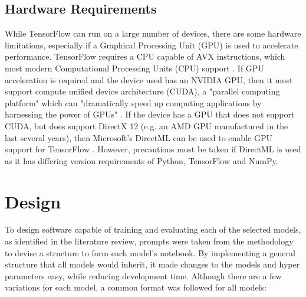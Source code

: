 \subsection{Hardware Requirements}
While TensorFlow can run on a large number of devices, there are some hardware limitations, especially if a Graphical Processing Unit (GPU) is used to accelerate performance. TensorFlow requires a CPU capable of AVX instructions, which most modern Computational Processing Units (CPU) support \citep{InstallT17:online}. If GPU acceleration is required and the device used has an NVIDIA GPU, then it must support compute unified device architecture (CUDA), a "parallel computing platform" which can "dramatically speed up computing applications by harnessing the power of GPUs" \citep{CUDAZone2:online}. If the device has a GPU that does not support CUDA, but does support DirectX 12 (e.g. an AMD GPU manufactured in the last several years), then Microsoft's DirectML can be used to enable GPU support for TensorFlow \citep{Introduc93:online}. However, precautions must be taken if DirectML is used as it has differing version requirements of Python, TensorFlow and NumPy.

\section{Design} \label{design}
To design software capable of training and evaluating each of the selected models, as identified in the literature review, prompts were taken from the methodology to devise a structure to form each model’s notebook. By implementing a general structure that all models would inherit, it made changes to the models and hyper parameters easy, while reducing development time. Although there are a few variations for each model, a common format was followed for all models:

